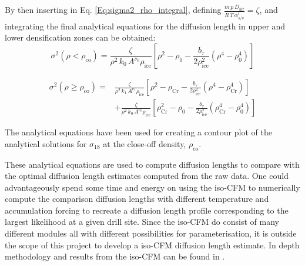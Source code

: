 \documentclass[../../CompleteThesis/Complete_1stDraft.tex]{subfiles}
\begin{document}
By then inserting in Eq. \ref{Eq:sigma2_rho_integral}, defining $\frac{m \, p \, D_{\text{air}}}{R \, T \, \alpha_{s/v}^i} = \zeta$, and integrating the final analytical equations for the diffusion length in upper and lower densification zones can be obtained:
\begin{equation}
	\sigma^2(\rho < \rho_{\text{co}}) = \frac{\zeta}{\rho^2 \, k_0 \, A^{\nu_0} \rho_{\text{ice}}}	\left[\rho^2 - \rho_0 - \frac{b_{\tau}}{2\rho_{\text{ice}}^2}(\rho^4 - \rho_0^4)\right]
	\label{Eq:sigma2_Final_Zone1}
\end{equation}

\begin{equation}
	\begin{split}
		\sigma^2(\rho \geq \rho_{\text{co}}) = &\frac{\zeta}{\rho^2 \, k_1 \, A^{\nu_1} \rho_{\text{ice}}}	\left[\rho^2 - \rho_{\text{Cr}} - \frac{b_{\tau}}{2\rho_{\text{ice}}^2}(\rho^4 - \rho_{\text{Cr}}^4)\right] \\
		&+ \frac{\zeta}{\rho^2 \, k_0 \, A^{\nu_0} \rho_{\text{ice}}} \left[\rho_ {\text{Cr}}^2 - \rho_0 - \frac{b_{\tau}}{2\rho_{\text{ice}}^2}(\rho_{\text{Cr}}^4 - \rho_0^4)\right]
	\end{split}
	\label{Eq:sigma2_Final_Zone2}
\end{equation}

The analytical equations have been used for creating a contour plot of the analytical solutions for $\sigma_{18}$ at the close-off density, $\rho_{\text{co}}$. 


These analytical equations are used to compute diffusion lengths to compare with the optimal diffusion length estimates computed from the raw data. One could advantageously spend some time and energy on using the iso-CFM to numerically compute the comparison diffusion lengths with different temperature and accumulation forcing to recreate a diffusion length profile corresponding to the largest likelihood at a given drill site. Since the iso-CFM do consist of many different modules all with different possibilities for parameterisation, it is outside the scope of this project to develop a iso-CFM diffusion length estimate. In depth methodology and results from the iso-CFM can be found in \cite[Gkinis et al., 2021]{Gkinis2021}.
\end{document}
